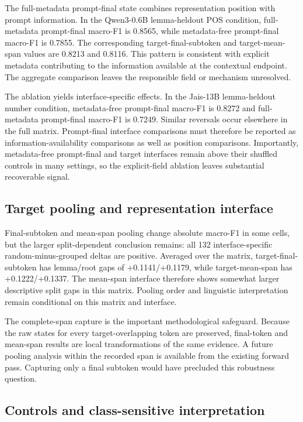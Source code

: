 \documentclass[pdflatex,sn-basic]{sn-jnl}
\begin{document}
The full-metadata prompt-final state combines representation position with
prompt information. In the Qwen3-0.6B lemma-heldout POS condition, full-metadata
prompt-final macro-F1 is 0.8565, while metadata-free prompt-final macro-F1 is
0.7855. The corresponding target-final-subtoken and target-mean-span values
are 0.8213 and 0.8116. This pattern is consistent with explicit metadata
contributing to the information available at the contextual endpoint. The
aggregate comparison leaves the responsible field or mechanism unresolved.

The ablation yields interface-specific effects. In the
Jais-13B lemma-heldout number condition, metadata-free prompt-final macro-F1
is 0.8272 and full-metadata prompt-final macro-F1 is 0.7249. Similar reversals
occur elsewhere in the full matrix. Prompt-final interface comparisons must
therefore be reported as information-availability comparisons as well as
position comparisons. Importantly, metadata-free prompt-final and target
interfaces remain above their shuffled controls in many settings, so the
explicit-field ablation leaves substantial recoverable signal.

\subsection{Target pooling and representation interface}

Final-subtoken and mean-span pooling change absolute macro-F1 in some cells,
but the larger split-dependent conclusion remains: all 132 interface-specific
random-minus-grouped deltas are positive. Averaged over the matrix,
target-final-subtoken has lemma/root gaps of +0.1141/+0.1179, while
target-mean-span has +0.1222/+0.1337. The mean-span interface therefore shows
somewhat larger descriptive split gaps in this matrix. Pooling order and
linguistic interpretation remain conditional on this matrix and interface.

The complete-span capture is the important methodological safeguard. Because
the raw states for every target-overlapping token are preserved, final-token
and mean-span results are local transformations of the same evidence. A
future pooling analysis within the recorded span is available from the
existing forward pass. Capturing only a final subtoken would have precluded
this robustness question.

\subsection{Controls and class-sensitive interpretation}
\end{document}
